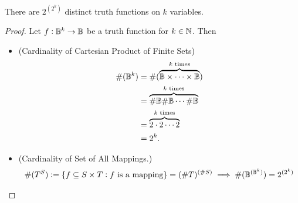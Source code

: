 \begin{tcolorbox}[colframe=procolor,title={\color{white}\bf Count of Truth Functions}]
\begin{proposition}
There are $2^{(2^k)}$ distinct truth functions on $k$ variables.
\end{proposition}
\end{tcolorbox}
\begin{proof}
Let $f:\mathbb{B}^k\to\mathbb{B}$ be a truth function for $k\in\mathbb{N}$. Then
\begin{itemize}
	\item[] (Cardinality of Cartesian Product of Finite Sets)
	\begin{align*}
		\#(\mathbb{B}^k)&=\#(\overbrace{\mathbb{B}\times\cdots\times\mathbb{B}}^{\text{$k$ times}})\\
		&=\overbrace{\#\mathbb{B}\#\mathbb{B}\cdots\#\mathbb{B}}^{\text{$k$ times}}\\
		&=\overbrace{2\cdot 2\cdots2}^{\text{$k$ times}}\\
		&=2^k.
	\end{align*}
	\item[] (Cardinality of Set of All Mappings.)
	\begin{align*}
	\#(T^S):=\set{f\subseteq S\times T:\text{$f$ is a mapping}}=(\# T)^{(\# S)}
	\implies \#(\mathbb{B}^{(\mathbb{B}^k)})=2^{(2^k)}
	\end{align*}
\end{itemize}
\end{proof}

